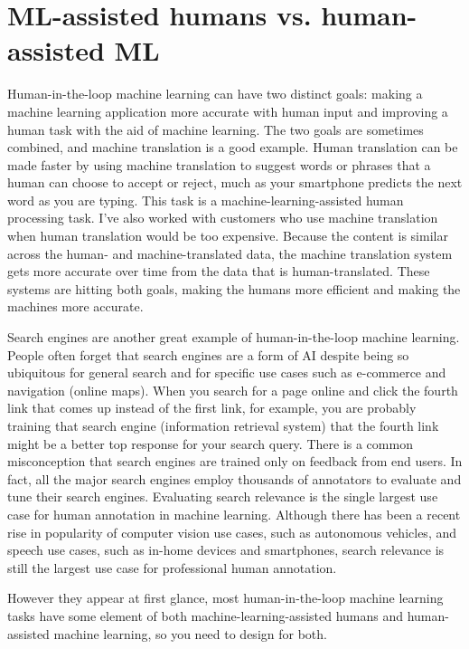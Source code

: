 \documentclass[sigconf,nonacm,screen,pbalance]{acmart}
\begin{document}
\section{ML-assisted humans vs. human-assisted ML}

Human-in-the-loop
machine
learning can have two distinct goals: making a machine learning application more
accurate with human input and improving a human task with the aid of machine learning.
The two goals are sometimes combined, and machine translation is a good example. Human
translation can be made faster by using machine translation to suggest words or phrases
that a human can choose to accept or reject, much as your smartphone predicts the next
word as you are typing. This task is a machine-learning-assisted human processing task.
I've also worked with customers who use machine translation when human translation would
be too expensive. Because the content is similar across the human- and
machine-translated data, the machine translation system gets more accurate over time
from the data that is human-translated. These systems are hitting both goals, making the
humans more efficient and making the machines more accurate.

Search
engines are another great example of human-in-the-loop machine learning. People often
forget that search engines are a form of AI despite being so ubiquitous for general
search and for specific use cases such as e-commerce and navigation (online maps). When
you search for a page online and click the fourth link that comes up instead of the
first link, for example, you are probably training that search engine (information
retrieval system) that the fourth link might be a better top response for your search
query. There is a common misconception that search engines are trained only on feedback
from end users. In fact, all the major search engines employ thousands of annotators to
evaluate and tune their search engines. Evaluating search relevance is the single
largest use case for human annotation in machine learning. Although there has been a
recent rise in popularity of computer vision use cases, such as autonomous vehicles, and
speech use cases, such as in-home devices and smartphones, search relevance is still the
largest use case for professional human annotation.

However
they appear at first glance, most human-in-the-loop machine learning tasks have some
element of both machine-learning-assisted humans and human-assisted machine learning, so
you need to design for both.
\end{document}
